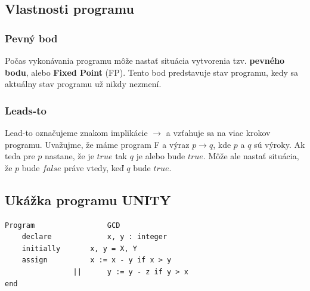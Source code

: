 \subsection{Vlastnosti programu}

\subsubsection{Pevný bod}

Počas vykonávania programu môže nastať situácia vytvorenia tzv. \textbf{pevného bodu}, 
alebo \textbf{Fixed Point} (FP). Tento bod predstavuje stav programu, kedy sa aktuálny stav 
programu už nikdy nezmení.

\subsubsection{Leads-to}
Lead-to označujeme znakom implikácie $\rightarrow$ a vzťahuje sa na viac krokov programu.
Uvažujme, že máme program F a výraz $p \rightarrow q$, kde $p$ a $q$ sú výroky. Ak teda pre $p$ nastane,
že je $true$ tak $q$ je alebo bude $true$. Môže ale nastať situácia, že $p$ bude $false$ práve vtedy, 
keď $q$ bude $true$.





\subsection{Ukážka programu UNITY}
\begin{lstlisting}
Program 				GCD
	declare 			x, y : integer
	initially	 	x, y = X, Y
	assign 			x := x - y if x > y
				||		y := y - z if y > x
end
\end{lstlisting}

